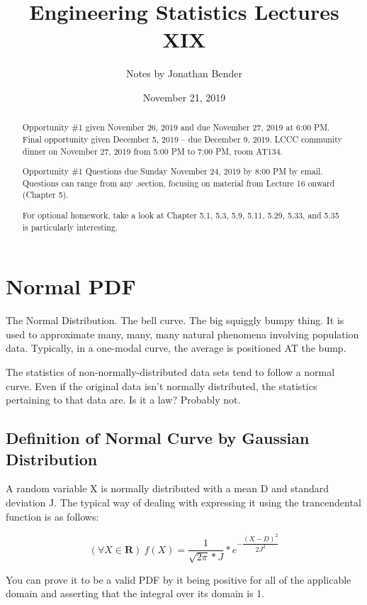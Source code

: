 \documentclass[]{article}
\title{Engineering Statistics Lectures XIX}
\author{Notes by Jonathan Bender}
\date{November 21, 2019}
\begin{document}
	
	\maketitle
	
	\begin{abstract}
		Opportunity \#1 given November 26, 2019 and due November 27, 2019 at 6:00 PM.
		Final opportunity given December 5, 2019 -- due December 9, 2019.
		LCCC community dinner on November 27, 2019 from 5:00 PM to 7:00 PM, room AT134.
		
		Opportunity \#1 Questions due Sunday November 24, 2019 by 8:00 PM by email. Questions can range from any .section, focusing on material from Lecture 16 onward (Chapter 5).
		
		For optional homework, take a look at Chapter 5.1, 5.3, 5.9, 5.11, 5.29, 5.33, and 5.35 is particularly interesting.
	\end{abstract}

	\section{Normal PDF}
		The Normal Distribution. The bell curve. The big squiggly bumpy thing. It is used to approximate many, many, many natural phenomena involving population data. Typically, in a one-modal curve, the average is positioned AT the bump.
		
		The statistics of non-normally-distributed data sets tend to follow a normal curve. Even if the original data isn't normally distributed, the statistics pertaining to that data are. Is it a law? Probably not. 
		
		\subsection{Definition of Normal Curve by Gaussian Distribution}
			A random variable X is normally distributed with a mean D and standard deviation J.
			The typical way of dealing with expressing it using the trancendental function is as follows:
			
			$$(\forall X\in \mathbf{R})\ f(X) = \dfrac{1}{\sqrt{2\pi}*J} * e^{-\dfrac{(X-D)^2}{2J^2}}$$
			
			You can prove it to be a valid PDF by it being positive for all of the applicable domain and asserting that the integral over its domain is 1.
			
\end{document}
